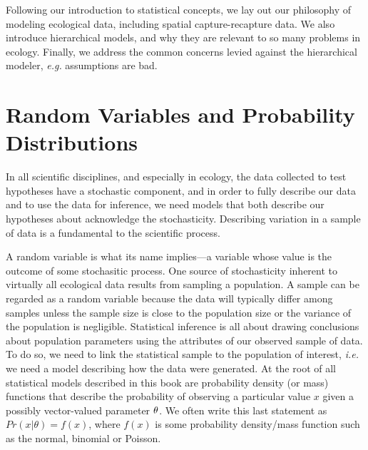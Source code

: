 Following our introduction to statistical concepts, we lay out our
philosophy of modeling ecological data, including spatial
capture-recapture data. We also introduce hierarchical
models, and why they are relevant to so many problems in
ecology. Finally, we address the common concerns levied against the
hierarchical modeler, \emph{e.g.} assumptions are bad.

\section{Random Variables and Probability Distributions}

In all scientific disciplines, and especially in ecology, the data
collected to test hypotheses have a stochastic component, and in
order to fully describe our data and to use the data for inference, we need
models that both describe our hypotheses about acknowledge the stochasticity.
 Describing variation in a sample of data is a fundamental to the
scientific process.

A random variable is what its name implies---a variable whose
value is the outcome of some stochasitic process. One source
of stochasticity inherent to virtually all ecological data
results from sampling a population. A sample can be
regarded as a random variable because the data will typically differ
among samples unless the sample size is close to the population size or the
variance of the population is negligible. Statistical inference is all
about drawing conclusions about population parameters
using the attributes of our observed sample of
data. To do so, we need to link the statistical sample to the
population of interest, \emph{i.e.} we need a model describing how
the data were generated. At the root of all statistical models
described in this book are probability density (or mass) functions
that describe the probability of observing a particular value $x$ given a
possibly vector-valued parameter $\bold \theta$. We often write this
last statement as $Pr(x | \theta) = f(x)$, where $f(x)$ is some
probability density/mass function such as the normal, binomial or Poisson.

